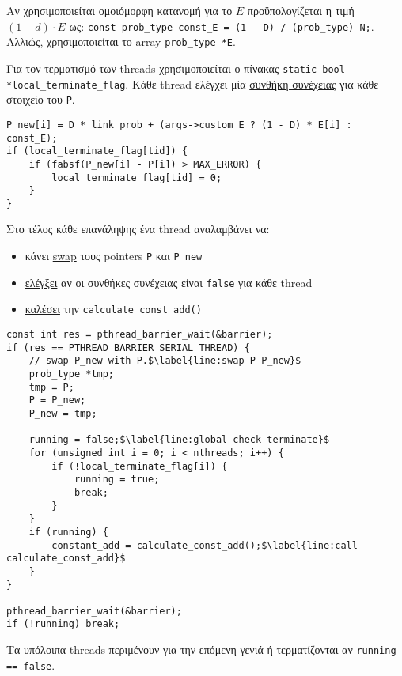 Αν χρησιμοποιείται ομοιόμορφη κατανομή για το $E$ προϋπολογίζεται η τιμή $(1-d) \cdot E$ ως:
\lstinline!const prob_type const_E = (1 - D) / (prob_type) N;!.
Αλλιώς, χρησιμοποιείται το array \lstinline!prob_type *E!.

Για τον τερματισμό των threads χρησιμοποιείται ο πίνακας \lstinline!static bool *local_terminate_flag!.
Κάθε thread ελέγχει μία \hyperref[lst:local_terminate]{συνθήκη συνέχειας} για κάθε στοιχείο του \lstinline!P!.
\begin{lstlisting}[caption={έλεγχο συνέχειας ανά thread}, escapechar=$, label={lst:local_terminate}]
P_new[i] = D * link_prob + (args->custom_E ? (1 - D) * E[i] : const_E);
if (local_terminate_flag[tid]) {
    if (fabsf(P_new[i] - P[i]) > MAX_ERROR) {
        local_terminate_flag[tid] = 0;
    }
}
\end{lstlisting}

Στο τέλος κάθε επανάληψης ένα thread αναλαμβάνει να:
\begin{itemize}
	\item κάνει \hyperref[line:swap-P-P_new]{swap} τους pointers \lstinline!P! και \lstinline!P_new! 
	\item \hyperref[line:global-check-terminate]{ελέγξει} αν οι συνθήκες συνέχειας είναι \lstinline!false! για κάθε thread
	\item \hyperref[line:call-calculate_const_add]{καλέσει} την \lstinline!calculate_const_add()!
\end{itemize}
\begin{lstlisting}[caption={swap P, P\_new και έλεγχος τερματισμού.}, escapechar=$, label={lst:gen_barrier}]
const int res = pthread_barrier_wait(&barrier);
if (res == PTHREAD_BARRIER_SERIAL_THREAD) {
    // swap P_new with P.$\label{line:swap-P-P_new}$
    prob_type *tmp;
    tmp = P;
    P = P_new;
    P_new = tmp;

    running = false;$\label{line:global-check-terminate}$
    for (unsigned int i = 0; i < nthreads; i++) {
        if (!local_terminate_flag[i]) {
            running = true;
            break;
        }
    }
    if (running) {
        constant_add = calculate_const_add();$\label{line:call-calculate_const_add}$
    }
}

pthread_barrier_wait(&barrier);
if (!running) break;
\end{lstlisting}
Τα υπόλοιπα threads περιμένουν για την επόμενη γενιά ή τερματίζονται αν \lstinline!running == false!.